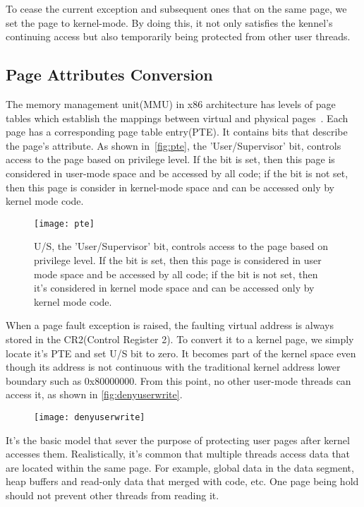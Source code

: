 To cease the current exception and subsequent ones that on the same page, we set the page to kernel-mode. By doing this, it not only satisfies the kennel's continuing access but also temporarily being protected from other user threads.


\subsection{Page Attributes Conversion}


The memory management unit(MMU) in x86 architecture has levels of page tables which establish the mappings between virtual and physical pages~\cite{intelpaging}. Each page has a corresponding page table entry(PTE). It contains bits that describe the page's attribute. As shown in~\autoref{fig:pte}, the 'User/Supervisor' bit, controls access to the page based on privilege level. If the bit is set, then this page is considered in user-mode space and be accessed by all code; if the bit is not set, then this page is consider in kernel-mode space and can be accessed only by kernel mode code.


\begin{figure}[th]
  \texttt{[image: pte]}
  \centering
  \caption{U/S, the 'User/Supervisor' bit, controls access to the page based on privilege level. If the bit is set, then this page is considered in user mode space and be accessed by all code; if the bit is not set, then it's considered in kernel mode space and can be accessed only by kernel mode code. }
  \label{fig:pte}
\end{figure}


When a page fault exception is raised, the faulting virtual address is always stored in the CR2(Control Register 2). To convert it to a kernel page, we simply locate it's PTE and set U/S bit to zero. It becomes part of the kernel space even though its address is not continuous with the traditional kernel address lower boundary such as 0x80000000. From this point, no other user-mode threads can access it, as shown in \autoref{fig:denyuserwrite}.

\begin{figure}[th]
  \texttt{[image: denyuserwrite]}
  \centering
  \caption{}
  \label{fig:denyuserwrite}
\end{figure}

It's the basic model that sever the purpose of protecting user pages after kernel accesses them. Realistically, it's common that multiple threads access data that are located within the same page. For example, global data in the data segment, heap buffers and read-only data that merged with code, etc. One page being hold should not prevent other threads from reading it.


